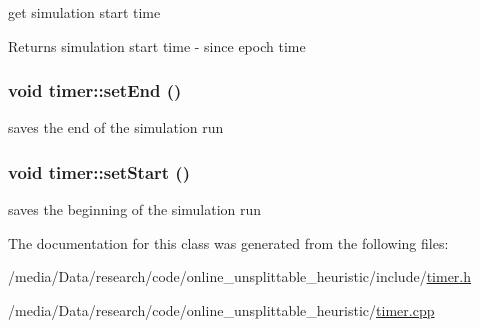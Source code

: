 get simulation start time 

\begin{DoxyReturn}{Returns}
simulation start time -\/ since epoch time 
\end{DoxyReturn}
\hypertarget{classtimer_ae666e8e84f8ccccd1280518bc7c3f9c0}{
\subsubsection[{setEnd}]{\setlength{\rightskip}{0pt plus 5cm}void timer::setEnd ()}}
\label{classtimer_ae666e8e84f8ccccd1280518bc7c3f9c0}


saves the end of the simulation run 

\hypertarget{classtimer_ac5b8fb9779cf72c599d3360a75bc5b89}{
\subsubsection[{setStart}]{\setlength{\rightskip}{0pt plus 5cm}void timer::setStart ()}}
\label{classtimer_ac5b8fb9779cf72c599d3360a75bc5b89}


saves the beginning of the simulation run 



The documentation for this class was generated from the following files:\begin{DoxyCompactItemize}
\item 
/media/Data/research/code/online\_\-unsplittable\_\-heuristic/include/\hyperlink{timer_8h}{timer.h}\item 
/media/Data/research/code/online\_\-unsplittable\_\-heuristic/\hyperlink{timer_8cpp}{timer.cpp}\end{DoxyCompactItemize}
